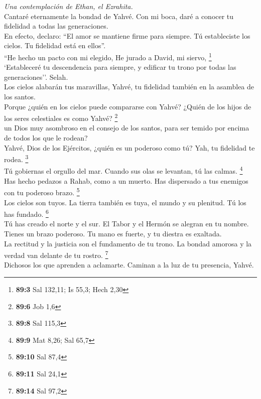 \emph{Una contemplación de Ethan, el Ezrahita.}\\
 Cantaré eternamente la bondad de Yahvé. Con mi boca, daré
a conocer tu fidelidad a todas las generaciones.\\
 En efecto, declaro: ``El amor se mantiene firme para
siempre. Tú estableciste los cielos. Tu fidelidad está en ellos''.\\
 ``He hecho un pacto con mi elegido, He jurado a David, mi
siervo, \footnote{\textbf{89:3} Sal 132,11; Is 55,3; Hech 2,30}\\
 `Estableceré tu descendencia para siempre, y edificar tu
trono por todas las generaciones''. Selah.\\
 Los cielos alabarán tus maravillas, Yahvé, tu fidelidad
también en la asamblea de los santos.\\
 Porque ¿quién en los cielos puede compararse con Yahvé?
¿Quién de los hijos de los seres celestiales es como Yahvé?
\footnote{\textbf{89:6} Job 1,6}\\
 un Dios muy asombroso en el consejo de los santos, para
ser temido por encima de todos los que le rodean?\\
 Yahvé, Dios de los Ejércitos, ¿quién es un poderoso como
tú? Yah, tu fidelidad te rodea. \footnote{\textbf{89:8} Sal 115,3}\\
 Tú gobiernas el orgullo del mar. Cuando sus olas se
levantan, tú las calmas. \footnote{\textbf{89:9} Mat 8,26; Sal 65,7}\\
 Has hecho pedazos a Rahab, como a un muerto. Has
dispersado a tus enemigos con tu poderoso brazo. \footnote{\textbf{89:10}
  Sal 87,4}\\
 Los cielos son tuyos. La tierra también es tuya, el
mundo y su plenitud. Tú los has fundado. \footnote{\textbf{89:11} Sal
  24,1}\\
 Tú has creado el norte y el sur. El Tabor y el Hermón se
alegran en tu nombre.\\
 Tienes un brazo poderoso. Tu mano es fuerte, y tu
diestra es exaltada.\\
 La rectitud y la justicia son el fundamento de tu trono.
La bondad amorosa y la verdad van delante de tu rostro. \footnote{\textbf{89:14}
  Sal 97,2}\\
 Dichosos los que aprenden a aclamarte. Caminan a la luz
de tu presencia, Yahvé.\\
